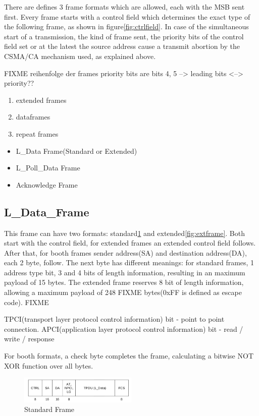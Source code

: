 There are defines 3 frame formats which are allowed, each  with the MSB sent first. Every frame starts with a control
field which determines the exact type of the following frame, as shown in figure\ref{fig:ctrlfield}.
In case of the simultaneous start of a transmission, the kind of frame sent, the priority bits of the control field set
or at the latest the source address cause a transmit abortion by the CSMA/CA mechanism used, as explained above.

FIXME
reihenfolge der frames
priority bits are bits 4, 5 --> leading bits <--> priority??


\begin{enumerate}
 \item extended frames
 \item dataframes
 \item repeat frames
\end{enumerate}


\begin{itemize}
 \item L\_Data Frame(Standard or Extended)
 \item L\_Poll\_Data Frame
 \item Acknowledge Frame
\end{itemize}

\subsection{L\_Data\_Frame}

This frame can have two formats: standard\ref{fig:stdframe} and extended\ref{fig:extframe}.
Both start with the control field, for extended frames an extended control field follows.
After that, for booth frames sender address(SA) and destination address(DA), each 2 byte, follow.
The next byte has different meanings: for standard frames, 1 address type bit, 3 
and 4 bits of length information, resulting in an maximum payload of 15 bytes. The extended frame reserves 8 bit of
length information, allowing a maximum payload of 248 FIXME bytes(0xFF is defined as escape code). FIXME

TPCI(transport layer protocol control information) bit - point to point connection.
APCI(application layer protocol control information) bit - read / write / response

For booth formats, a check byte completes the frame, calculating a bitwise NOT XOR function over all bytes.

\begin{figure}
    \centering
    \includegraphics[width=0.5\textwidth]{figures/standardframe.png}
    \caption{Standard Frame}
    \label{fig:stdframe}
\end{figure}

